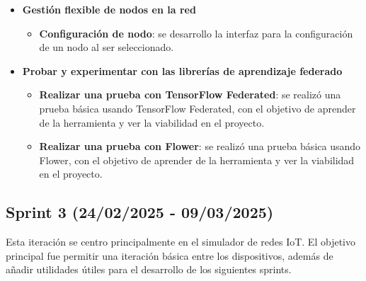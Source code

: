 \begin{itemize}
    \item \textbf{Gestión flexible de nodos en la red}
    \begin{itemize}
        \item \textbf{Configuración de nodo}: se desarrollo la interfaz para la configuración de un nodo al ser seleccionado.
    \end{itemize}
    \item \textbf{Probar y experimentar con las librerías de aprendizaje federado}
    \begin{itemize}
        \item \textbf{Realizar una prueba con TensorFlow Federated}: se realizó una prueba básica usando TensorFlow Federated, con el objetivo de aprender de la herramienta y ver la viabilidad en el proyecto.
        \item \textbf{Realizar una prueba con Flower}: se realizó una prueba básica usando Flower, con el objetivo de aprender de la herramienta y ver la viabilidad en el proyecto.
    \end{itemize}
\end{itemize}

\subsection{Sprint 3 (24/02/2025 - 09/03/2025)}
\label{subsec:TercerSprint}
Esta iteración se centro principalmente en el simulador de redes IoT. El objetivo principal fue permitir una iteración básica entre los dispositivos, además de añadir utilidades útiles para el desarrollo de los siguientes sprints.

